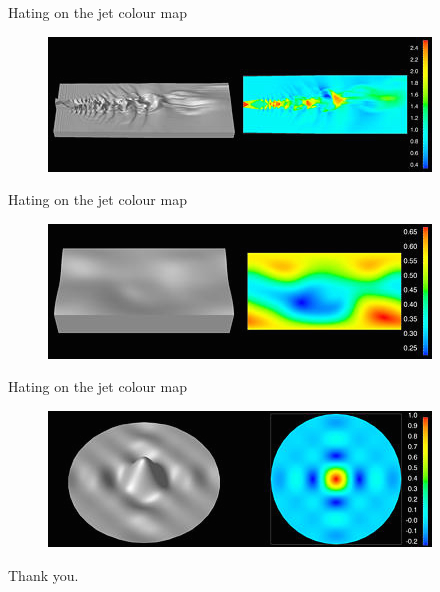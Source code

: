 \documentclass[10pt,presentation,compress]{beamer}
\begin{document}
\begin{frame}{Hating on the jet colour map}
  \begin{figure}[htp]
    \includegraphics[scale=0.75]{jetnoise.jpg}
  \end{figure}
\end{frame}

\begin{frame}{Hating on the jet colour map}
  \begin{figure}[htp]
    \includegraphics[scale=0.75]{magfield.jpg}
  \end{figure}
\end{frame}

\begin{frame}{Hating on the jet colour map}
  \begin{figure}[htp]
    \includegraphics[scale=0.75]{sinc.jpg}
  \end{figure}
\end{frame}

\begin{frame}
  \begin{center}
    Thank you.
  \end{center}
\end{frame}
\end{document}
